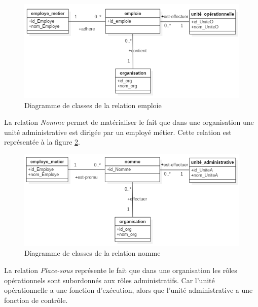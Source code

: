 \begin{figure}[h!]
    \centering
		\includegraphics[scale=0.7]{chap3/images/emploie.png}
    \caption{Diagramme de classes de la relation emploie}
	 \label{figemploie}
\end{figure} 

\label{sectionEmployeUniteA}

La relation \textit{Nomme} permet de matérialiser le fait que dans une organisation une unité administrative est dirigée par un employé métier. Cette relation est représentée à la figure \ref{fignomme}.

\begin{figure}[h!]
    \centering
		\includegraphics[scale=0.7]{chap3/images/nomme.png}
    \caption{Diagramme de classes de la relation nomme}
	 \label{fignomme}
\end{figure} 

\label{sectionUnitéOUniteA}

La relation \textit{Place-sous} représente le fait que dans une organisation les rôles opérationnels sont subordonnés aux rôles administratifs. Car l'unité opérationnelle a une fonction d'exécution, alors que l'unité administrative a une fonction de contrôle.

